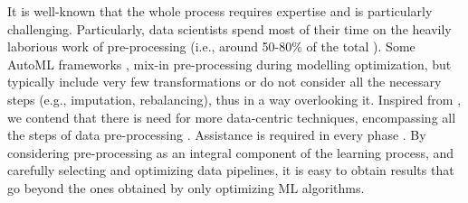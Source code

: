 It is well-known that the whole process requires expertise and is particularly challenging.
Particularly, data scientists spend most of their time on the heavily laborious work of pre-processing (i.e., around 50-80\% of the total \cite{Munson09Pre}).
Some AutoML frameworks \cite{auto_sklearn, mohr2018ml}, mix-in pre-processing during modelling optimization, but typically include very few transformations or do not consider all the necessary steps (e.g., imputation, rebalancing), thus in a way overlooking it.
Inspired from \cite{Munoz09DOLAP}, we contend that there is need for more data-centric techniques, encompassing all the steps of data pre-processing \cite{Vaisman14Book}.
Assistance is required in every phase \cite{Bilalli16IOTBD}.
By considering pre-processing as an integral component of the learning process, and carefully selecting and optimizing data pipelines, it is easy to obtain results that go beyond the ones obtained by only optimizing ML algorithms.

